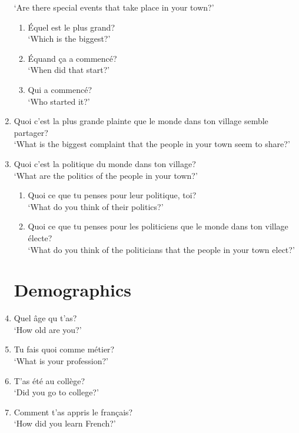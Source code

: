 \documentclass{article}
\begin{document}
\begin{enumerate}
                  `Are there special events that take place in your town?'
                \begin{enumerate}
                    \item Équel est le plus grand?\\
                          `Which is the biggest?'
                    \item Équand ça a commencé?\\
                          `When did that start?'
                    \item Qui a commencé?\\
                          `Who started it?'
                \end{enumerate}
            \item Quoi c'est la plus grande plainte que le monde dans ton village semble partager?\\
                  `What is the biggest complaint that the people in your town seem to share?'
            \item Quoi c'est la politique du monde dans ton village?\\
                  `What are the politics of the people in your town?'
            \begin{enumerate}
                \item Quoi ce que tu penses pour leur politique, toi?\\
                      `What do you think of their politics?'
                \item Quoi ce que tu penses pour les politiciens que le monde dans ton village électe?\\
                      `What do you think of the politicians that the people in your town elect?'
            \end{enumerate}
        \section{Demographics}
        \item Quel âge qu t'as?\\
              `How old are you?'
        \item Tu fais quoi comme métier?\\
              `What is your profession?'
        \item T'as été au collège?\\
              `Did you go to college?'
        \item Comment t'as appris le français?\\
              `How did you learn French?'
    \end{enumerate}
\end{document}
